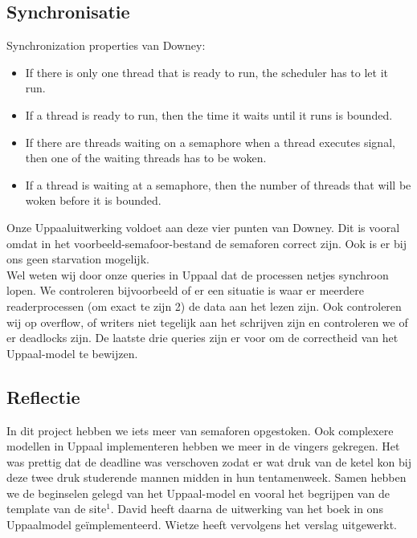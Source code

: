 \documentclass{article}
\begin{document}
\subsection*{Synchronisatie}
Synchronization properties van Downey:
\begin{itemize}
\item If there is only one thread that is ready to run, the scheduler has to let it run.
\item If a thread is ready to run, then the time it waits until it runs is bounded.
\item If there are threads waiting on a semaphore when a thread executes signal, then one of the waiting threads has to be woken.
\item If a thread is waiting at a semaphore, then the number of threads that will be woken before it is bounded.
\end{itemize}
Onze Uppaaluitwerking voldoet aan deze vier punten van Downey. Dit is vooral omdat in het voorbeeld-semafoor-bestand de semaforen correct zijn. Ook is er bij ons geen starvation mogelijk.\\
Wel weten wij door onze queries in Uppaal dat de processen netjes synchroon lopen. We controleren bijvoorbeeld of er een situatie is waar er meerdere readerprocessen (om exact te zijn 2) de data aan het lezen zijn. Ook controleren wij op overflow, of writers niet tegelijk aan het schrijven zijn en controleren we of er deadlocks zijn. De laatste drie queries zijn er voor om de correctheid van het Uppaal-model te bewijzen.

\subsection*{Reflectie}
In dit project hebben we iets meer van semaforen opgestoken. Ook complexere modellen in Uppaal implementeren hebben we meer in de vingers gekregen. Het was prettig dat de deadline was verschoven zodat er wat druk van de ketel kon bij deze twee druk studerende mannen midden in hun tentamenweek. Samen hebben we de beginselen gelegd van het Uppaal-model en vooral het begrijpen van de template van de site$^1$. David heeft daarna de uitwerking van het boek in ons Uppaalmodel ge\"implementeerd. Wietze heeft vervolgens het verslag uitgewerkt. 
\end{document}
